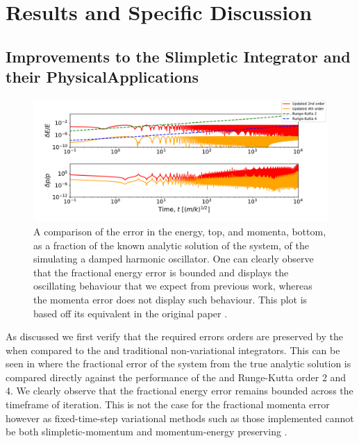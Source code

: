 \section{Results and Specific Discussion}
\subsection{Improvements to the Slimpletic Integrator and their PhysicalApplications}

\begin{figure}[t]
\label{fig:dho_energy_bounds}
  \includegraphics[width=\columnwidth]{figures/dho_energy_momenta_fractional_err.pdf}
  \caption{A comparison of the error in the energy, top, and momenta, bottom, as a fraction of the known analytic solution of the system, of the \updimpl{} simulating a damped harmonic oscillator. One can clearly observe that the fractional energy error is bounded and displays the oscillating behaviour that we expect from previous work, whereas the momenta error does not display such behaviour. This plot is based off its equivalent in the original paper \cite[Figure 2, bottom]{tsangSLIMPLECTICINTEGRATORSVARIATIONAL2015}.}
\end{figure}

As discussed we first verify that the required errors orders are preserved by the \updimpl{} when compared to the \orgimpl{} and traditional non-variational integrators. This can be seen in  where the fractional error of the system from the true analytic solution is compared directly against the performance of the \orgimpl{} and Runge-Kutta order 2 and 4. We clearly observe that the fractional energy error remains bounded across the timeframe of iteration. This is not the case for the fractional momenta error however as fixed-time-step variational methods such as those implemented cannot be both slimpletic-momentum and momentum-energy preserving \cite{zhongLiePoissonHamiltonJacobiTheory1988}.

